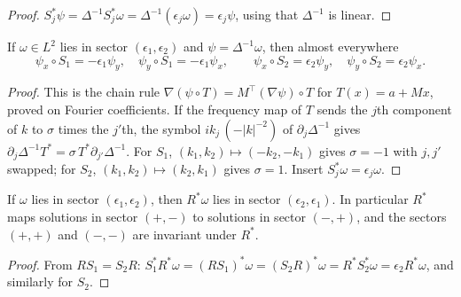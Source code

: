 \begin{proof}
\leanok
$S_j^*\psi=\Delta^{-1}S_j^*\omega=\Delta^{-1}(\epsilon_j\omega)=\epsilon_j\psi$,
using that $\Delta^{-1}$ is linear.
\end{proof}

\begin{lemma}
\label{lem:stream-derivative-parities}
\leanok
If $\omega\in L^2$ lies in sector $(\epsilon_1,\epsilon_2)$ and $\psi=\Delta^{-1}\omega$, then
almost everywhere
\[
  \psi_x\circ S_1=-\epsilon_1\psi_y,\quad \psi_y\circ S_1=-\epsilon_1\psi_x,\qquad
  \psi_x\circ S_2=\epsilon_2\psi_y,\quad \psi_y\circ S_2=\epsilon_2\psi_x .
\]
\end{lemma}

\begin{proof}
\leanok
This is the chain rule $\nabla(\psi\circ T)=M^\top(\nabla\psi)\circ T$ for $T(x)=a+Mx$, proved on
Fourier coefficients. If the frequency map of $T$ sends the $j$th component of $k$ to
$\sigma$ times the $j'$th, the symbol $ik_j\,(-|k|^{-2})$ of $\partial_j\Delta^{-1}$
gives $\partial_j\Delta^{-1}T^*=\sigma\,T^*\partial_{j'}\Delta^{-1}$. For $S_1$,
$(k_1,k_2)\mapsto(-k_2,-k_1)$ gives $\sigma=-1$ with $j,j'$ swapped; for $S_2$,
$(k_1,k_2)\mapsto(k_2,k_1)$ gives $\sigma=1$. Insert $S_j^*\omega=\epsilon_j\omega$.
\end{proof}

\begin{lemma}
\label{lem:sector-swap}
\leanok
If $\omega$ lies in sector $(\epsilon_1,\epsilon_2)$, then $R^*\omega$ lies in
sector $(\epsilon_2,\epsilon_1)$. In particular $R^*$ maps solutions in sector
$(+,-)$ to solutions in sector $(-,+)$, and the sectors $(+,+)$ and $(-,-)$ are
invariant under $R^*$.
\end{lemma}

\begin{proof}
\leanok
From $RS_1=S_2R$: $S_1^*R^*\omega=(R S_1)^*\omega=(S_2R)^*\omega
=R^*S_2^*\omega=\epsilon_2R^*\omega$, and similarly for $S_2$.
\end{proof}


